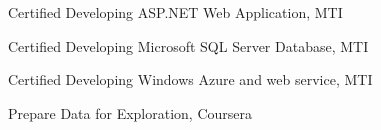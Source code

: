 Certified Developing ASP.NET Web Application, 
MTI	
 
Certified Developing Microsoft SQL Server 
Database, MTI	

Certified Developing Windows Azure and web 
service, MTI	

Prepare Data for Exploration, Coursera	


 
